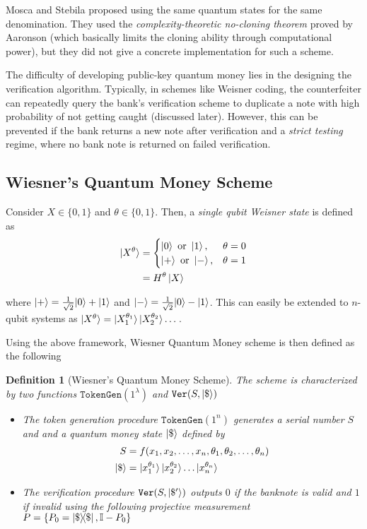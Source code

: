 \documentclass[]{article}
\newtheorem{definition}{Definition}
\newcommand*{\I}{\mathbb I}
\newcommand*{\dollar}{\$}
\begin{document}
Mosca and Stebila \cite{mosca2009quantum} proposed using the same quantum states for the same denomination. They used the \textit{complexity-theoretic no-cloning theorem} proved by Aaronson \cite{Aaronson_2009} (which basically limits the cloning ability through computational power), but they did not give a concrete implementation for such a scheme. 

The difficulty of developing public-key quantum money lies in the designing the verification algorithm. Typically, in schemes like Weisner coding, the counterfeiter can repeatedly query the bank's verification scheme to duplicate a note with high probability of not getting caught (discussed later). However, this can be prevented if the bank returns a new note after verification and a \textit{strict testing} regime, where no bank note is returned on failed verification.


\subsection{Wiesner's Quantum Money Scheme}

Consider $X \in \{0, 1\}$ and $\theta \in \{0, 1\}$. Then, a \textit{single qubit Weisner state} is defined as 
\begin{align}
    \ket{X^\theta} &= \begin{cases}
        \ket{0} \text{ or } \ket{1}, & \theta = 0 \\
        \ket{+} \text{ or } \ket{-}, & \theta = 1 
    \end{cases} \\
    &= H^\theta \ket{X}
\end{align}

where $\ket{+} = \frac{1}{\sqrt{2}}{\ket{0} + \ket{1}}$ and $\ket{-} = \frac{1}{\sqrt{2}}{\ket{0} - \ket{1}}$. This can easily be extended to $n$-qubit systems as $\ket{X^{\theta}} = \ket{X_1^{\theta_1}}\ket{X_2^{\theta_2}} \dots$.

Using the above framework, Wiesner Quantum Money scheme is then defined as the following
\begin{definition}[Wiesner's Quantum Money Scheme]
    The scheme is characterized by two functions $\texttt{TokenGen}(1^\lambda)$ and $\texttt{Ver}(S, \ket{\dollar})$
    \begin{itemize}
    \item The token generation procedure $\texttt{TokenGen}(1^n)$ generates a serial number $S$ and  and a quantum money state $\ket{\dollar}$ defined by 
    \begin{align}
        S &= f(x_1, x_2, \dots, x_n, \theta_1, \theta_2, \dots, \theta_n) \\
        \ket{\dollar} &= \ket{x_1^{\theta_1}}\ket{x_2^{\theta_2}} \dots \ket{x_n^{\theta_n}}
    \end{align}
    
    \item The verification procedure $\texttt{Ver}(S, \ket{\dollar'})$ outputs $0$ if the banknote is valid and $1$ if invalid using the following projective measurement $P = \{P_0 = \ketbra{\dollar}{\dollar}, \I - P_0\}$
\end{itemize}
\end{definition}
\end{document}
